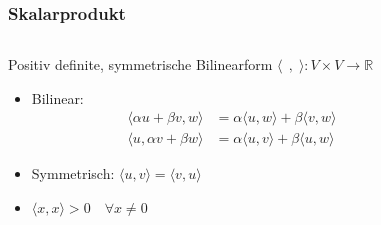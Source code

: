 %
%
%
\begin{frame}[t]
\setlength{\abovedisplayskip}{5pt}
\setlength{\belowdisplayskip}{5pt}
\frametitle{Skalarprodukt}
\vspace{-15pt}
\begin{columns}[t,onlytextwidth]
\begin{column}{0.48\textwidth}
\begin{block}{Positiv definite, symmetrische Bilinearform}
$\langle \;\,,\;\rangle\colon V\times V\to \mathbb{R}$
\begin{itemize}
\item<2->
Bilinear:
\begin{align*}
\langle \alpha u+\beta v,w\rangle
&=
\alpha\langle u,w\rangle
+
\beta\langle v,w\rangle
\\
\langle u,\alpha v+\beta w\rangle
&=
\alpha\langle u,v\rangle
+
\beta\langle u,w\rangle
\end{align*}
\item<3->
Symmetrisch: $\langle u,v\rangle = \langle v,u\rangle$
\item<4->
$\langle x,x\rangle >0 \quad\forall x\ne 0$
\end{itemize}
\end{block}
\end{column}
\begin{column}{0.48\textwidth}
\end{column}
\end{columns}
\begin{columns}[t,onlytextwidth]

\end{columns}
\end{frame}

